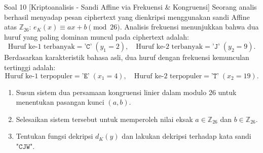 \documentclass[11pt,a4paper]{article}
\begin{document}
\begin{soalanalisis}{Soal 10 [Kriptoanalisis - Sandi Affine via Frekuensi \& Kongruensi]}
Seorang analis berhasil menyadap pesan ciphertext yang dienkripsi menggunakan sandi Affine atas $\mathbb{Z}_{26}$: $e_K(x) \equiv ax + b \pmod{26}$.
Analisis frekuensi menunjukkan bahwa dua huruf yang paling dominan muncul pada ciphertext adalah:
\[
\text{Huruf ke-1 terbanyak} = \texttt{'C'} \; (y_1 = 2), \quad \text{Huruf ke-2 terbanyak} = \texttt{'J'} \; (y_2 = 9).
\]
Berdasarkan karakteristik bahasa asli, dua huruf dengan frekuensi kemunculan tertinggi adalah:
\[
\text{Huruf ke-1 terpopuler} = \texttt{'E'} \; (x_1 = 4), \quad \text{Huruf ke-2 terpopuler} = \texttt{'T'} \; (x_2 = 19).
\]
\begin{enumerate}[label=(\alph*)]
    \item Susun sistem dua persamaan kongruensi linier dalam modulo 26 untuk menentukan pasangan kunci $(a, b)$.
    \item Selesaikan sistem tersebut untuk memperoleh nilai eksak $a \in \mathbb{Z}_{26}$ dan $b \in \mathbb{Z}_{26}$.
    \item Tentukan fungsi dekripsi $d_K(y)$ dan lakukan dekripsi terhadap kata sandi $\texttt{"CJW"}$.
\end{enumerate}
\end{soalanalisis}
\end{document}
